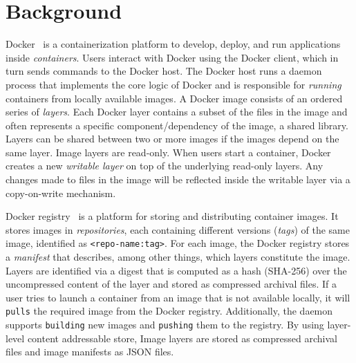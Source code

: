\section{Background}
\label{sec:background}

Docker~\cite{docker} is a containerization platform to develop, deploy, and run
applications inside \emph{containers}.  Users interact with Docker using the
Docker client, which in turn sends commands to the Docker host.  The Docker
host runs a daemon process that implements the core logic of Docker and is
responsible for \emph{running} containers from locally available images.  A
Docker image consists of an ordered series of \emph{layers}.  Each Docker layer
contains a subset of the files in the image and often represents a specific
component/dependency of the image, \eg a shared library.  Layers can be shared
between two or more images if the images depend on the same layer.  Image
layers are read-only.  When users start a container, Docker creates a new
\emph{writable layer} on top of the underlying read-only layers.
Any changes made to files in the image will be reflected inside the writable
layer via a copy-on-write mechanism.

% 
%


Docker registry~\cite{docker-hub} is a platform for storing and distributing container
images.  It stores images in \emph{repositories}, each containing different
versions (\emph{tags}) of the same image, identified as
\texttt{<repo-name:tag>}.  For each image, the Docker registry stores a
\emph{manifest} that describes, among other things, which layers constitute the
image.
Layers are identified via a digest that is computed as a hash (SHA-256) over
the uncompressed content of the layer and stored as compressed archival files.
If a user tries to launch a container from an image that is not available
locally, it will \texttt{pulls} the required image from the Docker registry.
Additionally, the daemon supports \texttt{building} new images and
\texttt{pushing} them to the registry.  By using layer-level content
addressable store, Image layers are stored as compressed archival files and
image manifests as JSON files.
%


